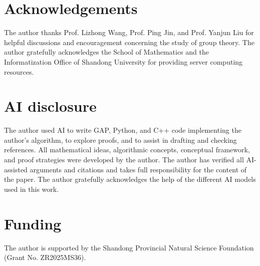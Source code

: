 \documentclass[11pt,a4paper]{amsart}
\theoremstyle{definition}
\theoremstyle{remark}
\numberwithin{equation}{section}
\begin{document}
\section*{Acknowledgements}
The author thanks Prof. Lizhong Wang, Prof. Ping Jin, and Prof. Yanjun Liu
for helpful discussions and encouragement concerning the study of group theory.
The author gratefully acknowledges the School of Mathematics and the
Informatization Office of Shandong University for providing server computing resources.


\section*{AI disclosure}
The author used AI to write GAP, Python, and C++ code implementing the author's algorithm, to explore proofs, and to assist in drafting and checking references. All mathematical ideas, algorithmic concepts, conceptual framework, and proof strategies were developed by the author. The author has verified all AI-assisted arguments and citations and takes full responsibility for the content of the paper. The author gratefully acknowledges the help of the different AI models used in this work.


\section*{Funding}
The author is supported by the Shandong Provincial Natural Science Foundation (Grant No. ZR2025MS36).


\end{document}
